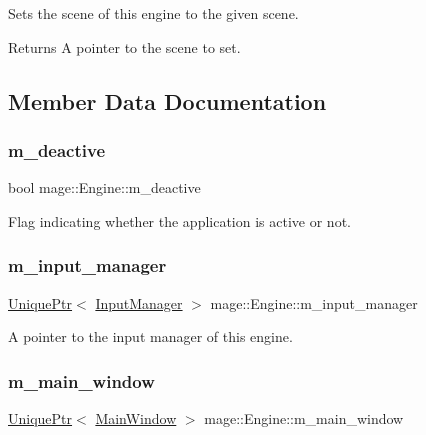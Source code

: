 Sets the scene of this engine to the given scene.

\begin{DoxyReturn}{Returns}
A pointer to the scene to set. 
\end{DoxyReturn}


\subsection{Member Data Documentation}
\hypertarget{classmage_1_1_engine_ab8a4b0157403708ae7d1d018a95b4c63}{}\label{classmage_1_1_engine_ab8a4b0157403708ae7d1d018a95b4c63} 
\subsubsection{\texorpdfstring{m\+\_\+deactive}{m\_deactive}}
{\footnotesize\ttfamily bool mage\+::\+Engine\+::m\+\_\+deactive\hspace{0.3cm}{\ttfamily [private]}}

Flag indicating whether the application is active or not. \hypertarget{classmage_1_1_engine_a8e9048208a6a5c5b034aaa1cbdab28bc}{}\label{classmage_1_1_engine_a8e9048208a6a5c5b034aaa1cbdab28bc} 
\subsubsection{\texorpdfstring{m\+\_\+input\+\_\+manager}{m\_input\_manager}}
{\footnotesize\ttfamily \hyperlink{namespacemage_a8c307fbcc33bce9b7f2aa4c26c3b95cf}{Unique\+Ptr}$<$ \hyperlink{classmage_1_1_input_manager}{Input\+Manager} $>$ mage\+::\+Engine\+::m\+\_\+input\+\_\+manager\hspace{0.3cm}{\ttfamily [private]}}

A pointer to the input manager of this engine. \hypertarget{classmage_1_1_engine_a3aea7e8c0c1247cac570334a3d3543d6}{}\label{classmage_1_1_engine_a3aea7e8c0c1247cac570334a3d3543d6} 
\subsubsection{\texorpdfstring{m\+\_\+main\+\_\+window}{m\_main\_window}}
{\footnotesize\ttfamily \hyperlink{namespacemage_a8c307fbcc33bce9b7f2aa4c26c3b95cf}{Unique\+Ptr}$<$ \hyperlink{classmage_1_1_main_window}{Main\+Window} $>$ mage\+::\+Engine\+::m\+\_\+main\+\_\+window\hspace{0.3cm}{\ttfamily [private]}}

